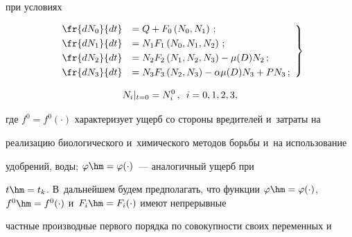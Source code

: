 при условиях


\begin{equation}


\left.


\begin{array}{rl}


\fr{dN_0}{dt} &= Q+F_0\left(N_0, N_1\right)\,;\\[3pt]


\fr{dN_1}{dt} &= N_1F_1\left(N_0, N_1, N_2\right)\,;\\[3pt]


\fr{dN_2}{dt} &= N_2 F_2\left( N_1, N_2, N_3\right) -\mu(D)N_2\,;\\[3pt]


\fr{dN_3}{dt} &= N_3F_3\left( N_2, N_3\right) -\alpha\mu (D) N_3+PN_3\,;


\end{array}


\right\}


\label{e5-od}


\end{equation}





\vspace*{-13pt}





\noindent


$$


N_i\vert_{t=0}=N_i^0\,,\enskip i=0,1,2,3,


$$


где $f^0=f^0(\cdot)$ характеризует ущерб со стороны вредителей и~затраты на 


реализацию биологического и~химического методов борьбы и~на использование 


удобрений, воды; $\varphi\hm= \varphi(\cdot)$~--- аналогичный ущерб при 


$t\hm=t_k$. В~дальнейшем будем предполагать, что функции $\varphi\hm= 


\varphi(\cdot)$, $f^0\hm= f^0(\cdot)$ и~$F_i\hm= F_i(\cdot)$ имеют непрерывные 


частные производные первого порядка по совокупности своих переменных и





\noindent


